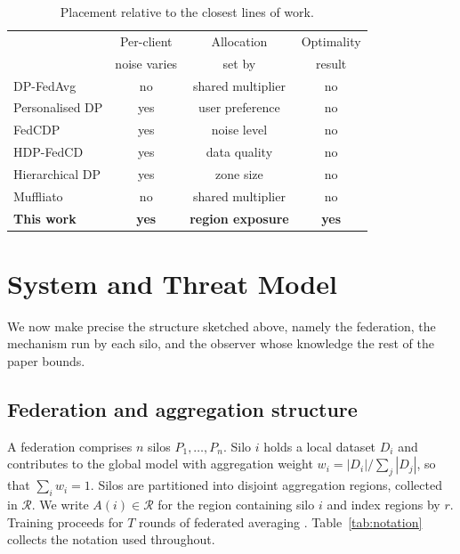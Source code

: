 \documentclass[acmsmall,screen,review,anonymous]{acmart}
\theoremstyle{acmdefinition}%
\newcommand{\Reg}{\mathcal{R}}
\begin{document}
\begin{table}[t]
\caption{Placement relative to the closest lines of work.}
\label{tab:related}
\centering
\footnotesize
\setlength{\tabcolsep}{3.5pt}
\begin{tabular}{@{}lccc@{}}
\toprule
& Per-client & Allocation & Optimality \\
& noise varies & set by & result \\
\midrule
DP-FedAvg \cite{mcmahan2018dprnn}      & no  & shared multiplier   & no \\
Personalised DP \cite{jorgensen2015personalized} & yes & user preference & no \\
FedCDP \cite{guo2025fedcdp}            & yes & noise level         & no \\
HDP-FedCD \cite{yin2026hdpfedcd}       & yes & data quality        & no \\
Hierarchical DP \cite{chandrasekaran2022hfl} & yes & zone size     & no \\
Muffliato \cite{cyffers2022muffliato}  & no  & shared multiplier   & no \\
\textbf{This work}                     & \textbf{yes} & \textbf{region exposure} & \textbf{yes} \\
\bottomrule
\end{tabular}
\end{table}

\section{System and Threat Model}
\label{sec:model}

We now make precise the structure sketched above, namely the federation, the
mechanism run by each silo, and the observer whose knowledge the rest of the paper
bounds.

\subsection{Federation and aggregation structure}

A federation comprises $n$ silos $P_1, \dots, P_n$. Silo $i$ holds a local dataset
$D_i$ and contributes to the global model with aggregation weight $w_i = |D_i| /
\sum_j |D_j|$, so that $\sum_i w_i = 1$. Silos are partitioned into disjoint
aggregation regions, collected in $\Reg$. We write $A(i) \in \Reg$ for the region
containing silo $i$ and index regions by $r$. Training proceeds for $T$ rounds of
federated averaging \cite{mcmahan2017fedavg}. Table~\ref{tab:notation} collects the
notation used throughout.
\end{document}
